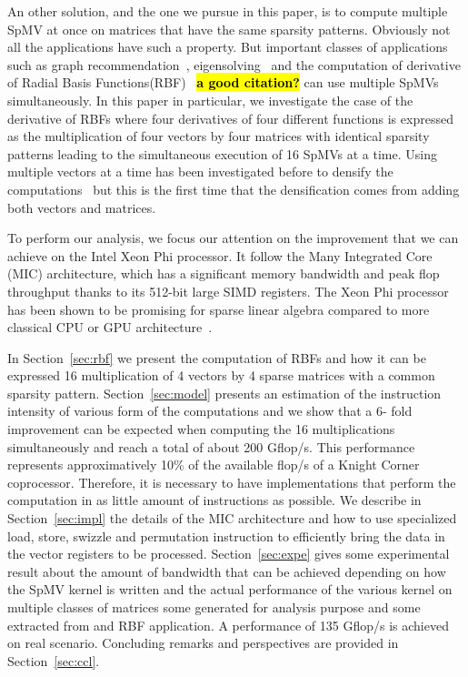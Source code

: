 \documentclass[10pt,conference,compsocconf]{IEEEtran}
\newcommand{\todo}[1]{{\color{red}\textbf{\hl{#1}}\xspace}}
\begin{document}
An other solution, and the one we pursue in this paper, is to compute
multiple SpMV at once on matrices that have the same sparsity
patterns. Obviously not all the applications have such a property. But
important classes of applications such as graph
recommendation~\cite{Kucuktunc13-SNAM}, eigensolving~\cite{LOBPCG} and the computation of
derivative of Radial Basis Functions(RBF)~\cite{} \todo{a good citation?} can use multiple
SpMVs simultaneously. In this paper in particular, we investigate the
case of the derivative of RBFs where four derivatives of four
different functions is expressed as the multiplication of four vectors
by four matrices with identical sparsity patterns leading to the
simultaneous execution of 16 SpMVs at a time. Using multiple vectors
at a time has been investigated before to densify the
computations~\cite{Im01} but this is the first time that the
densification comes from adding both vectors and matrices.

To perform our analysis, we focus our attention on the improvement
that we can achieve on the Intel Xeon Phi processor. It follow the
Many Integrated Core (MIC) architecture, which has a significant
memory bandwidth and peak flop throughput thanks to its 512-bit large
SIMD registers. The Xeon Phi processor has been shown to be promising
for sparse linear algebra compared to more classical CPU or GPU
architecture~\cite{Saule13-ARXIV, Liu:2013:ESM:2464996.2465013, cramer2012openmp}.

In Section~\ref{sec:rbf} we present the computation of RBFs and how it
can be expressed 16 multiplication of 4 vectors by 4 sparse matrices
with a common sparsity pattern. Section~\ref{sec:model} presents an
estimation of the instruction intensity of various form of the
computations and we show that a 6- fold improvement can be
expected when computing the 16 multiplications simultaneously and
reach a total of about 200 Gflop/s. This performance represents
approximatively 10\% of the available flop/s of a Knight Corner
coprocessor. Therefore, it is necessary to have implementations that
perform the computation in as little amount of instructions as
possible. We describe in Section~\ref{sec:impl} the details of the MIC
architecture and how to use specialized load, store, swizzle and
permutation instruction to efficiently bring the data in the vector
registers to be processed. Section~\ref{sec:expe} gives some
experimental result about the amount of bandwidth that can be achieved
depending on how the SpMV kernel is written and the actual performance
of the various kernel on multiple classes of matrices some generated
for analysis purpose and some extracted from and RBF application. A
performance of 135 Gflop/s is achieved on real scenario. Concluding
remarks and perspectives are provided in Section~\ref{sec:ccl}.
\end{document}

